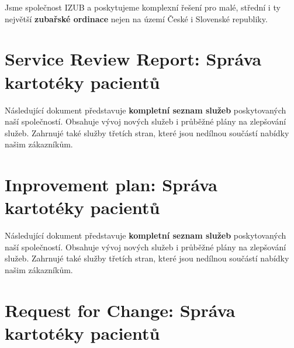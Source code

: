 \documentclass[11pt, a4paper, titlepage]{article}
\begin{document}
	
	\pagestyle{fancy}

	\noindent Jsme společnost IZUB a poskytujeme komplexní řešení pro malé, střední i ty největší \textbf{zubařské ordinace} nejen na území České i Slovenské republiky.

	\vspace{0.5em}

	\section*{Service Review Report: Správa kartotéky pacientů}

	\noindent\makebox[\linewidth]{\rule{17.5cm}{0.4pt}}

	\vspace{0.5em}

	\noindent Následující dokument představuje \textbf{kompletní seznam služeb} poskytovaných naší společností. Obsahuje vývoj nových služeb i průběžné plány na zlepšování služeb. Zahrnujé také služby třetích stran, které jsou nedílnou součástí nabídky našim zákazníkům. 

	\noindent\makebox[\linewidth]{\rule{17.5cm}{0.4pt}}

	\section*{Inprovement plan: Správa kartotéky pacientů}

	\vspace{0.5em}

	\noindent\makebox[\linewidth]{\rule{17.5cm}{0.4pt}}

	\vspace{0.5em}

	\noindent Následující dokument představuje \textbf{kompletní seznam služeb} poskytovaných naší společností. Obsahuje vývoj nových služeb i průběžné plány na zlepšování služeb. Zahrnujé také služby třetích stran, které jsou nedílnou součástí nabídky našim zákazníkům. 

	\noindent\makebox[\linewidth]{\rule{17.5cm}{0.4pt}}

	\section*{Request for Change: Správa kartotéky pacientů}
\end{document}
